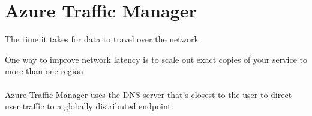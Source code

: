 \documentclass{article}[18pt]
\begin{document}
\section{Azure Traffic Manager}
\begin{definition}
	The time it takes for data to travel over the network
\end{definition}
One way to improve network latency is to scale out exact copies of your service to more than one region\\
\\
Azure Traffic Manager uses the DNS server that's closest to the user to direct user traffic to a globally distributed endpoint.
\end{document}
